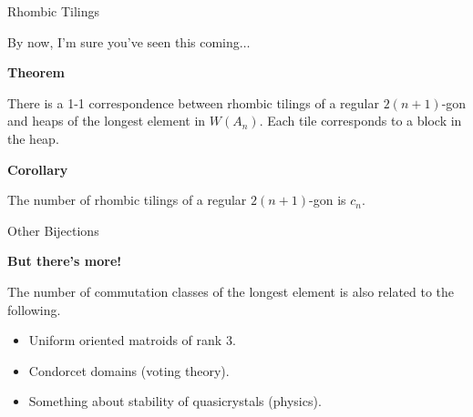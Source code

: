 \documentclass[10pt, compress,aspectratio=169,handout]{beamer}
\begin{document}

\begin{frame}{Rhombic Tilings}\pause

\vspace{1em}

By now, I'm sure you've seen this coming$\ldots$

\pause

\begin{block}{\textbf{Theorem}}

\vspace{-.5em}

There is a 1-1 correspondence between rhombic tilings of a regular $2(n+1)$-gon and heaps of the longest element in $W(A_n)$. Each tile corresponds to a block in the heap.

\end{block}

\pause

\begin{block}{\textbf{Corollary}}

\vspace{-.5em}

The number of rhombic tilings of a regular $2(n+1)$-gon is $c_n$.
\end{block}

\end{frame}


\begin{frame}{Other Bijections}\pause

\vspace{1em}

\begin{block}{\textbf{But there's more!}}

\vspace{-.5em}

The number of commutation classes of the longest element is also related to the following. \pause

\vspace{-.5em}

\begin{itemize}

\item Uniform oriented matroids of rank 3. \pause
\item Condorcet domains (voting theory). \pause
\item Something about stability of quasicrystals (physics).
\end{itemize}
\end{block}

\end{frame}
\end{document}
